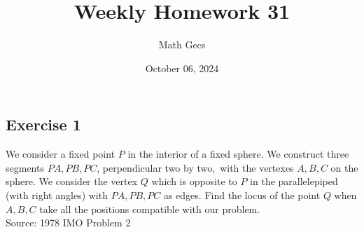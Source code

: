 \documentclass[12pt]{article}
\title{Weekly Homework 31}
\author{Math Gecs}
\date{October 06, 2024}
\begin{document}
\maketitle

\subsection*{Exercise 1}
We consider a fixed point $P$ in the interior of a fixed sphere$.$ We construct three segments $PA, PB,PC$, perpendicular two by two$,$ with the vertexes $A, B, C$ on the sphere$.$ We consider the vertex $Q$ which is opposite to $P$ in the parallelepiped (with right angles) with $PA, PB, PC$ as edges$.$ Find the locus of the point $Q$ when $A, B, C$ take all the positions compatible with our problem.\\

Source: 1978 IMO Problem 2\\
\end{document}
